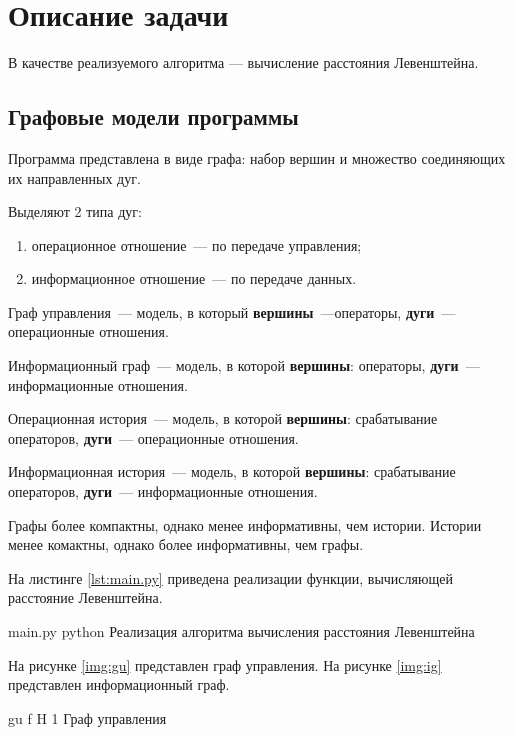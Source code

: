 \chapter{Описание задачи}

В качестве реализуемого алгоритма --- вычисление расстояния Левенштейна.

\section{Графовые модели программы}

Программа представлена в виде графа: набор вершин и множество соединяющих их направленных дуг.


Выделяют 2 типа дуг:
\begin{enumerate}
	\item операционное отношение~--- по передаче управления;
	\item информационное отношение~--- по передаче данных.
\end{enumerate}

Граф управления~--- модель, в который \textbf{вершины}~---операторы, \textbf{дуги}~--- операционные отношения.

Информационный граф~--- модель, в которой \textbf{вершины}: операторы, \textbf{дуги}~--- информационные отношения.

Операционная история~--- модель, в которой \textbf{вершины}: срабатывание операторов, \textbf{дуги}~--- операционные отношения.

Информационная история~--- модель, в которой \textbf{вершины}: срабатывание операторов, \textbf{дуги}~--- информационные отношения.

Графы более компактны, однако менее информативны, чем истории. Истории менее комактны, однако более информативны, чем графы.

На листинге \ref{lst:main.py} приведена реализации функции, вычисляющей расстояние Левенштейна.

\clearpage

{main.py} %
{python} %
{Реализация алгоритма вычисления расстояния Левенштейна} %

\clearpage

На рисунке \ref{img:gu} представлен граф управления.
На рисунке \ref{img:ig} представлен информационный граф.

{gu} %
{f} %
{H} %
{1\textwidth} %
{Граф управления} %


